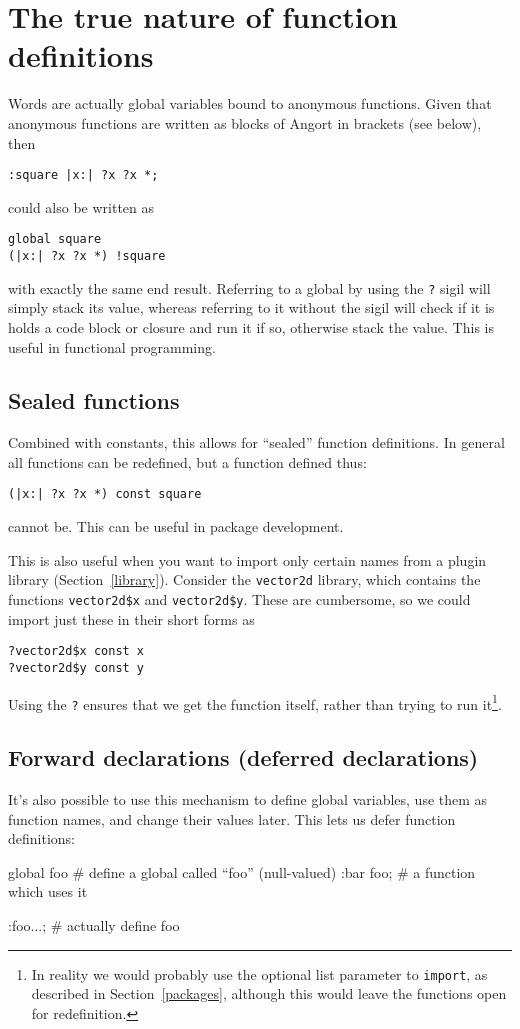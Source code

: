 



\section{The true nature of function definitions}
\label{globdetails}
Words are actually global variables bound to anonymous functions.
Given that anonymous functions are written as blocks of Angort
in brackets (see below), then
\begin{lstlisting}
:square |x:| ?x ?x *;
\end{lstlisting}
could also be written as
\begin{lstlisting}
global square
(|x:| ?x ?x *) !square
\end{lstlisting}
with exactly the same end result. Referring to a global by using the \texttt{?} sigil
will simply stack its value, whereas referring to it without the sigil
will check if it is holds a code block or closure and run it if so, otherwise
stack the value. This is useful in functional programming.

\subsection{Sealed functions}
Combined with constants, this allows for ``sealed'' function definitions. 
In general all functions can be redefined, but a function defined thus:
\begin{lstlisting}
(|x:| ?x ?x *) const square
\end{lstlisting}
cannot be. This can be useful in package development.

This is also useful when you want to import only certain names from
a plugin library (Section~\ref{library}). Consider the \texttt{vector2d} library, which contains
the functions \texttt{vector2d\$x} and \texttt{vector2d\$y}. These
are cumbersome, so we could import just these in their short forms
as
\begin{lstlisting}
?vector2d$x const x
?vector2d$y const y
\end{lstlisting}
Using the \texttt{?} ensures that we get the function itself, rather
than trying to run it\footnote{In reality we would probably use
the optional list parameter to \texttt{import}, as described in
Section~\ref{packages}, although this would leave the functions
open for redefinition.}.

\subsection{Forward declarations (deferred declarations)}
It's also possible to use this mechanism to define global variables,
use them as function names, and change their values later. This lets
us defer function definitions:
\begin{v}
global foo      # define a global called ``foo'' (null-valued)
:bar foo;       # a function which uses it

:foo...;        # actually define foo
\end{v}

